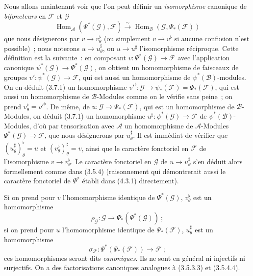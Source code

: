 \begin{env}[4.4.3]
\label{0.4.4.3-fr}
Nous allons maintenant voir que l'on peut définir un \emph{isomorphisme}
canonique de \emph{bifoncteurs} en $\mathcal{F}$ et $\mathcal{G}$
\[
  \operatorname{Hom}_{\mathcal{A}}(\Psi^*(\mathcal{G}),\mathcal{F})
  \xrightarrow{\sim}
  \operatorname{Hom}_{\mathcal{B}}(\mathcal{G},\Psi_*(\mathcal{F}))
  \tag{4.4.3.1}\label{0.4.4.3.1-fr}
\]
que nous désignerons par $v\to v_\theta^\flat$ (ou simplement
$v\to v^\flat$ si aucune confusion n'est possible)~; nous noterons
$u\to u_\theta^\sharp$, ou $u\to u^\sharp$ l'isomorphisme réciproque.
Cette définition est la suivante~: en composant
$v:\Psi^*(\mathcal{G})\to\mathcal{F}$ avec l'application canonique
$\psi^*(\mathcal{G})\to\Psi^*(\mathcal{G})$, on obtient un homomorphisme de
faisceaux de groupes $v':\psi^*(\mathcal{G})\to\mathcal{F}$, qui est aussi un
homomorphisme de $\psi^*(\mathcal{B})$-modules. On en déduit (3.7.1) un
homomorphisme
${v'}^\flat:\mathcal{G}\to\psi_*(\mathcal{F})=\Psi_*(\mathcal{F})$, qui est
aussi un homomorphisme de $\mathcal{B}$-Modules comme on
le vérifie sans peine~; on prend $v_\theta^\flat={v'}^\flat$. De même, de
$u:\mathcal{G}\to\Psi_*(\mathcal{F})$, qui est un homomorphisme de
$\mathcal{B}$-Modules, on déduit (3.7.1) un homomorphisme
$u^\sharp:\psi^*(\mathcal{G})\to\mathcal{F}$ de
$\psi^*(\mathcal{B})$-Modules, d'où par tensorisation avec $\mathcal{A}$ un
homomorphisme de $\mathcal{A}$-Modules
$\Psi^*(\mathcal{G})\to\mathcal{F}$, que nous désignerons par
$u_\theta^\sharp$. Il est immédiat de vérifier que
$(u_\theta^\sharp)_\theta^\flat=u$ et
$(v_\theta^\flat)_\theta^\sharp=v$, ainsi que le caractère fonctoriel en
$\mathcal{F}$ de l'isomorphisme $v\to v_\theta^\flat$. Le caractère
fonctoriel en $\mathcal{G}$ de $u\to u_\theta^\sharp$ s'en déduit alors
formellement comme dans (3.5.4) (raisonnement qui démontrerait aussi le
caractère fonctoriel de $\Psi^*$ établi dans (4.3.1) directement).

Si on prend pour $v$ l'homomorphisme identique de $\Psi^*(\mathcal{G})$,
$v_\theta^\flat$ est un homomorphisme
\[
  \rho_{\mathcal{G}}:\mathcal{G}\longrightarrow
  \Psi_*(\Psi^*(\mathcal{G}))~;
  \tag{4.4.3.2}\label{0.4.4.3.2-fr}
\]
si on prend pour $u$ l'homomorphisme identique de $\Psi_*(\mathcal{F})$,
$u_\theta^\sharp$ est un homomorphisme
\[
  \sigma_{\mathcal{F}}:\Psi^*(\Psi_*(\mathcal{F}))
  \longrightarrow\mathcal{F}~;
  \tag{4.4.3.3}\label{0.4.4.3.3-fr}
\]
ces homomorphismes seront dits \emph{canoniques}. Ils ne sont en général ni
injectifs ni surjectifs. On a des factorisations canoniques analogues à
(3.5.3.3) et (3.5.4.4).


\end{env}
